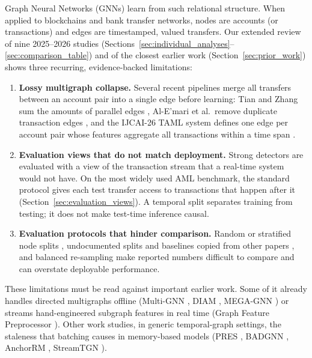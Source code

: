 \documentclass[11pt,a4paper]{article}
\begin{document}
Graph Neural Networks (GNNs) \cite{kipf2017gcn,hamilton2017sage,velickovic2018gat} learn from such relational structure. When applied to blockchains and bank transfer networks, nodes are accounts (or transactions) and edges are timestamped, valued transfers. Our extended review of nine 2025--2026 studies (Sections~\ref{sec:individual_analyses}--\ref{sec:comparison_table}) and of the closest earlier work (Section~\ref{sec:prior_work}) shows three recurring, evidence-backed limitations:
\begin{enumerate}[leftmargin=*]
    \item \textbf{Lossy multigraph collapse.} Several recent pipelines merge all transfers between an account pair into a single edge before learning: Tian and Zhang sum the amounts of parallel edges \cite{tian2025kar}, Al-E'mari et al.\ remove duplicate transaction edges \cite{alemari2026explainable}, and the IJCAI-26 TAML system defines one edge per account pair whose features aggregate all transactions within a time span \cite{rico2026taml}.
    \item \textbf{Evaluation views that do not match deployment.} Strong detectors are evaluated with a view of the transaction stream that a real-time system would not have. On the most widely used AML benchmark, the standard protocol gives each test transfer access to transactions that happen after it (Section~\ref{sec:evaluation_views}). A temporal split separates training from testing; it does not make test-time inference causal.
    \item \textbf{Evaluation protocols that hinder comparison.} Random or stratified node splits \cite{jia2025lmae4eth,kasula2025ajk,alemari2026explainable}, undocumented splits and baselines copied from other papers \cite{li2025tfgat}, and balanced re-sampling \cite{tian2025kar} make reported numbers difficult to compare and can overstate deployable performance.
\end{enumerate}

These limitations must be read against important earlier work. Some of it already handles directed multigraphs offline (Multi-GNN \cite{egressy2024multigraph}, DIAM \cite{ding2024diam}, MEGA-GNN \cite{bilgi2026mega}) or streams hand-engineered subgraph features in real time (Graph Feature Preprocessor \cite{blanusa2024gfp}). Other work studies, in generic temporal-graph settings, the staleness that batching causes in memory-based models (PRES \cite{su2024pres}, BADGNN \cite{zhou2025badgnn}, AnchorRM \cite{anchorrm2026}, StreamTGN \cite{streamtgn2026}).
\end{document}
